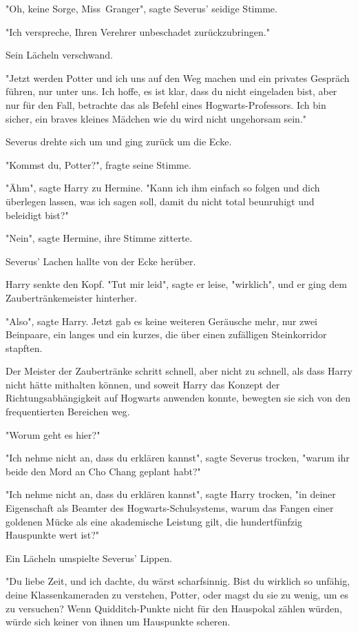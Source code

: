 {"Oh, keine Sorge, Miss~Granger", sagte Severus' seidige Stimme.

"Ich verspreche, Ihren Verehrer unbeschadet zurückzubringen."

Sein Lächeln verschwand.

"Jetzt werden Potter und ich uns auf den Weg machen und ein privates Gespräch führen, nur unter uns. Ich hoffe, es ist klar, dass du nicht eingeladen bist, aber nur für den Fall, betrachte das als Befehl eines Hogwarts-Professors. Ich bin sicher, ein braves kleines Mädchen wie du wird nicht ungehorsam sein."

Severus drehte sich um und ging zurück um die Ecke.

"Kommst du, Potter?", fragte seine Stimme.

"Ähm", sagte Harry zu Hermine. "Kann ich ihm einfach so folgen und dich überlegen lassen, was ich sagen soll, damit du nicht total beunruhigt und beleidigt bist?"

"Nein", sagte Hermine, ihre Stimme zitterte.

Severus' Lachen hallte von der Ecke herüber.

Harry senkte den Kopf. "Tut mir leid", sagte er leise, "wirklich", und er ging dem Zaubertränkemeister hinterher.

"Also", sagte Harry. Jetzt gab es keine weiteren Geräusche mehr, nur zwei Beinpaare, ein langes und ein kurzes, die über einen zufälligen Steinkorridor stapften.

Der Meister der Zaubertränke schritt schnell, aber nicht zu schnell, als dass Harry nicht hätte mithalten können, und soweit Harry das Konzept der Richtungsabhängigkeit auf Hogwarts anwenden konnte, bewegten sie sich von den frequentierten Bereichen weg.

"Worum geht es hier?"

"Ich nehme nicht an, dass du erklären kannst", sagte Severus trocken, "warum ihr beide den Mord an Cho Chang geplant habt?"

"Ich nehme nicht an, dass du erklären kannst", sagte Harry trocken, "in deiner Eigenschaft als Beamter des Hogwarts-Schulsystems, warum das Fangen einer goldenen Mücke als eine akademische Leistung gilt, die hundertfünfzig Hauspunkte wert ist?"

Ein Lächeln umspielte Severus' Lippen.

"Du liebe Zeit, und ich dachte, du wärst scharfsinnig. Bist du wirklich so unfähig, deine Klassenkameraden zu verstehen, Potter, oder magst du sie zu wenig, um es zu versuchen? Wenn Quidditch-Punkte nicht für den Hauspokal zählen würden, würde sich keiner von ihnen um Hauspunkte scheren.

}
